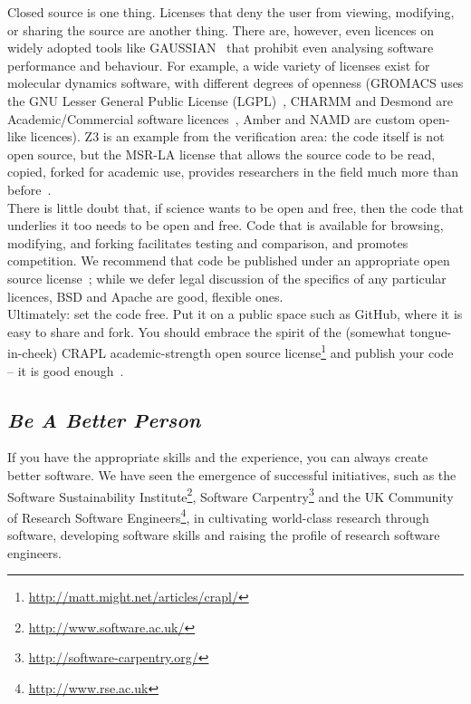 \documentclass[a4paper,11pt]{article}
\begin{document}
Closed source is one thing. Licenses that deny the user from viewing,
modifying, or sharing the source are another thing. There are,
however, even licences on widely adopted tools like
GAUSSIAN~\cite{Giles2004} that prohibit even analysing software
performance and behaviour. For example, a wide variety of licenses
exist for molecular dynamics software, with different degrees of
openness (GROMACS uses the GNU Lesser General Public License
(LGPL)~\cite{Hess2008}, CHARMM and Desmond are Academic/Commercial
software licences~\cite{Brooks2009,Bowers2006}, Amber and NAMD are
custom open-like licences). Z3 is an example from the verification
area: the code itself is not open source, but the MSR-LA license that
allows the source code to be read, copied, forked for academic use,
provides researchers in the field much more than
before~\cite{deMoura2012Z3open}.\\
 
 There is little
doubt that, if science wants to be open and free, then the code that
underlies it too needs to be open and free. Code that is available for
browsing, modifying, and forking facilitates testing and comparison,
and promotes competition. We recommend that code be published under an
appropriate open source license~\cite{osl}; while we defer legal
discussion of the specifics of any particular licences, BSD and Apache are good,
flexible ones.\\

Ultimately: set the code free. Put it on a public space such as
GitHub, where it is easy to share and fork. You should embrace the
spirit of the (somewhat tongue-in-cheek) CRAPL academic-strength open
source license\footnote{\url{http://matt.might.net/articles/crapl/}}
and publish your code -- it is good enough~\cite{barnes:2010}.

\subsection{{\emph{Be A Better Person}}}

If you have the appropriate skills and the experience, you can always
create better software. We have seen the emergence of successful
initiatives, such as the Software Sustainability
Institute\footnote{\url{http://www.software.ac.uk/}}, Software
Carpentry\footnote{\url{http://software-carpentry.org/}} and the UK
Community of Research Software
Engineers\footnote{\url{http://www.rse.ac.uk}}, in cultivating
world-class research through software, developing software skills and
raising the profile of research software engineers.
\end{document}
